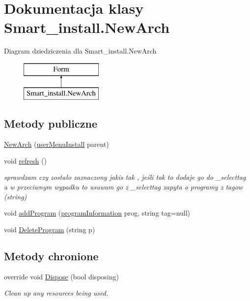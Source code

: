 \hypertarget{class_smart__install_1_1_new_arch}{\section{Dokumentacja klasy Smart\+\_\+install.\+New\+Arch}
\label{class_smart__install_1_1_new_arch}
}
Diagram dziedziczenia dla Smart\+\_\+install.\+New\+Arch\begin{figure}[H]
\begin{center}
\leavevmode
\includegraphics[height=2.000000cm]{class_smart__install_1_1_new_arch}
\end{center}
\end{figure}
\subsection*{Metody publiczne}
\begin{DoxyCompactItemize}
\item 
\hyperlink{class_smart__install_1_1_new_arch_aa9169659caa4fa4e2a273d8dc6076362}{New\+Arch} (\hyperlink{class_smart__install_1_1user_menu_install}{user\+Menu\+Install} parent)
\item 
void \hyperlink{class_smart__install_1_1_new_arch_a73f1f94a96c3e3a0c3729673aeb2caa8}{refresh} ()
\begin{DoxyCompactList}\small\item\em sprawdzam czy zostało zaznaczony jakis tak , jeśli tak to dodaje go do \+\_\+selecttag a w przeciwnym wypadku to usuwam go z \+\_\+selecttag zapyta o programy z tagow (string) \end{DoxyCompactList}\item 
void \hyperlink{class_smart__install_1_1_new_arch_a7d8c334fdfb9872ce29ac88d9d8fbd8f}{add\+Program} (\hyperlink{class_smart__install_1_1program_information}{program\+Information} prog, string tag=null)
\item 
void \hyperlink{class_smart__install_1_1_new_arch_a5dc5c16b7ae357601c701f0d90819000}{Delete\+Program} (string p)
\end{DoxyCompactItemize}
\subsection*{Metody chronione}
\begin{DoxyCompactItemize}
\item 
override void \hyperlink{class_smart__install_1_1_new_arch_ae0b2866651d46def93594aa2665b876d}{Dispose} (bool disposing)
\begin{DoxyCompactList}\small\item\em Clean up any resources being used. \end{DoxyCompactList}\end{DoxyCompactItemize}

